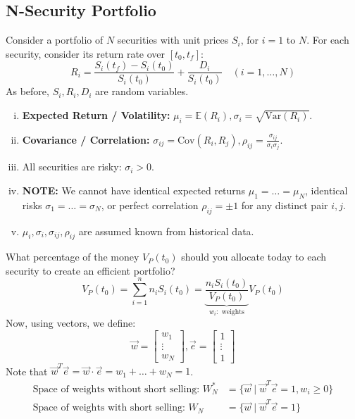 \subsection{N-Security Portfolio}
Consider a portfolio of \(N\) securities with unit prices \(S_i\), for \(i= 1\) to \(N\). For each security, consider its return rate over \([t_0, t_f]\):
\begin{equation*}
    R_i = \frac{S_i(t_f) - S_i(t_0)}{S_i(t_0)} + \frac{D_i}{S_i(t_0)} \quad (i= 1, \dots, N)
\end{equation*}
As before, \(S_i, R_i, D_i\) are random variables.
\begin{enumerate}[i.]
    \item \textbf{Expected Return / Volatility: } \(\mu_i = \mathbb{E}(R_i), \sigma_i = \sqrt{\text{Var}(R_i)}\).
    \item \textbf{Covariance / Correlation: } \(\sigma_{ij} = \text{Cov}(R_i, R_j), \rho_{ij} = \frac{\sigma_{ij}}{\sigma_i \sigma_j}\).
    \item All securities are risky: \(\sigma_i > 0\).
    \item \textbf{NOTE: } We cannot have identical expected returns \(\mu_1 = \dots = \mu_N\), identical risks \(\sigma_1 = \dots = \sigma_N\), or perfect correlation \(\rho_{ij} = \pm 1\) for any distinct pair \(i, j\).
    \item \(\mu_i, \sigma_i, \sigma_{ij}, \rho_{ij}\) are assumed known from historical data.
\end{enumerate}
What percentage of the money \(V_P(t_0)\) should you allocate today to each security to create an efficient portfolio?
\begin{equation*}
    V_P(t_0) = \sum_{i=1}^n n_iS_i(t_0) = \underbrace{\frac{n_iS_i(t_0)}{V_P(t_0)}}_{w_i: \text{ weights}} V_P(t_0)
\end{equation*}
Now, using vectors, we define:
\begin{equation*}
    \vec{w} = \begin{bmatrix}
        w_1 \\ \vdots \\ w_N
    \end{bmatrix}, \vec{e} = \begin{bmatrix}
        1 \\ \vdots \\ 1
    \end{bmatrix}
\end{equation*}
Note that \(\vec{w}^T\vec{e} = \vec{w} \cdot \vec{e} = w_1 + \dots + w_N = 1\).
\begin{align*}
    \text{Space of weights without short selling: } W_N^* &= \{\vec{w}  \mid \vec{w}^T\vec{e} = 1, w_i \ge 0\} \\
    \text{Space of weights with short selling: } W_N &= \{\vec{w} \mid \vec{w}^T\vec{e} = 1\}
\end{align*}
